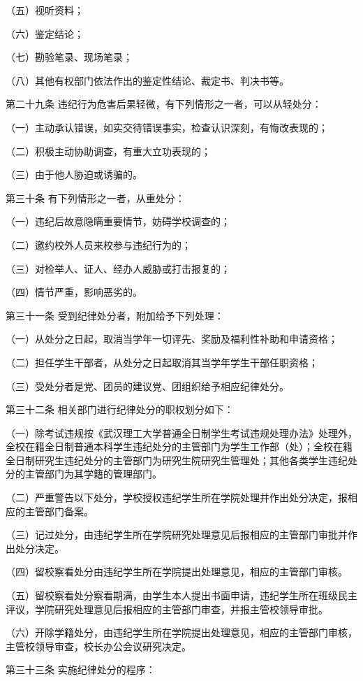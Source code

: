 \documentclass[UTF8,12pt,a4paper]{report}
\begin{document}
（五）视听资料； 

（六）鉴定结论； 

（七）勘验笔录、现场笔录；

（八）其他有权部门依法作出的鉴定性结论、裁定书、判决书等。

第二十九条  违纪行为危害后果轻微，有下列情形之一者，可以从轻处分：

（一）主动承认错误，如实交待错误事实，检查认识深刻，有悔改表现的；

（二）积极主动协助调查，有重大立功表现的；

（三）由于他人胁迫或诱骗的。

第三十条  有下列情形之一者，从重处分：

（一）违纪后故意隐瞒重要情节，妨碍学校调查的；

（二）邀约校外人员来校参与违纪行为的；

（三）对检举人、证人、经办人威胁或打击报复的；

（四）情节严重，影响恶劣的。

第三十一条  受到纪律处分者，附加给予下列处理：

（一）从处分之日起，取消当学年一切评先、奖励及福利性补助和申请资格；

（二）担任学生干部者，从处分之日起取消其当学年学生干部任职资格；

（三）受处分者是党、团员的建议党、团组织给予相应纪律处分。

第三十二条  相关部门进行纪律处分的职权划分如下：

（一）除考试违规按《武汉理工大学普通全日制学生考试违规处理办法》处理外，全校在籍全日制普通本科学生违纪处分的主管部门为学生工作部（处）；全校在籍全日制研究生违纪处分的主管部门为研究生院研究生管理处；其他各类学生违纪处分的主管部门为其学籍的管理部门。

（二）严重警告以下处分，学校授权违纪学生所在学院处理并作出处分决定，报相应的主管部门备案。

（三）记过处分，由违纪学生所在学院研究处理意见后报相应的主管部门审批并作出处分决定。

（四）留校察看处分由违纪学生所在学院提出处理意见，相应的主管部门审核。

（五）留校察看处分察看期满，由学生本人提出书面申请，违纪学生所在班级民主评议，学院研究处理意见后报相应的主管部门审查，并报主管校领导审批。

（六）开除学籍处分，由违纪学生所在学院提出处理意见，相应的主管部门审核，主管校领导审查，校长办公会议研究决定。

第三十三条  实施纪律处分的程序：
\end{document}
